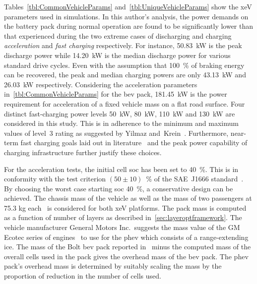 Tables~\ref{tbl:CommonVehicleParams} and~\ref{tbl:UniqueVehicleParams}  show the
\gls{xeV}  parameters  used  in  simulations. In  this  author's  analysis,  the
power  demands on  the battery  pack  during normal  operation are  found to  be
significantly  lower than  that  experienced  during the  two  extreme cases  of
discharging  and charging  \viz{} \emph{acceleration}  and \emph{fast  charging}
respectively. For  instance, \SI{50.83}{\kilo\watt} is the  peak discharge power
while \SI{14.20}{\kilo\watt} is the median  discharge power for various standard
drive  cycles.  Even with  the  assumption  that \SI{100}{\percent}  of  braking
energy  can  be  recovered,  the  peak  and  median  charging  powers  are  only
\SI{43.13}{\kilo\watt} and \SI{26.03}{\kilo\watt}  respectively. Considering the
acceleration  parameters  in~\cref{tbl:CommonVehicleParams}  for  the  \gls{bev}
pack, \SI{181.45}{\kilo\watt}  is the  power requirement  for acceleration  of a
fixed vehicle  mass on a  flat road  surface. Four distinct  fast-charging power
levels \viz{} \SI{50}{\kilo\watt}, \SI{80}{\kilo\watt}, \SI{110}{\kilo\watt} and
\SI{130}{\kilo\watt}  are considered  in this  study.  This is  in adherence  to
the  minimum  and maximum  values  of  level~3  rating  as suggested  by  Yilmaz
and~Krein~\cite{Yilmaz2012}. Furthermore, near-term fast charging goals laid out
in  literature~\cite{Ashique2017,Srdic2016} and  the  peak  power capability  of
charging infrastructure further justify these choices.



For  the  acceleration  tests,  the  initial cell  \gls{soc}  has  been  set  to
\SI{40}{\percent}.  This  is  in  conformity with  the  test  criterion  $(50\pm
10)$~\%  of  the  SAE~J1666   standard~\cite{Sae2010}.  By  choosing  the  worst
case  starting  \gls{soc} \ie{}  \SI{40}{\percent},  a  conservative design  can
be  achieved.  The  chassis  mass  of  the  vehicle  as  well  as  the  mass  of
two  passengers   at  75.3  kg   each~\cite{Sae2010}  is  considered   for  both
\gls{xeV}  platforms. The  pack mass  is  computed as  a function  of number  of
layers  as described  in~\cref{sec:layeroptframework}. The  vehicle manufacturer
General  Motors  Inc.\ suggests  the  mass  value of  the  GM  Ecotec series  of
engines~\cite{motortrendEcotec} to  use for the  \gls{phev} which consists  of a
range-extending  \gls{ice}.  The  mass  of  the  Bolt  \gls{bev}  pack  reported
in~\cite{ChevyBoltSpecs} minus  the computed mass  of the overall cells  used in
the pack  gives the overhead mass  of the \gls{bev} pack.  The \gls{phev} pack's
overhead mass  is determined by suitably  scaling the mass by  the proportion of
reduction in the number of cells used.

